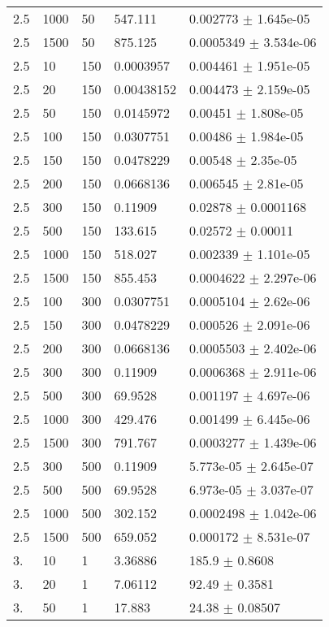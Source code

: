 \begin{longtable}{lllll}
 2.5 &  1000 &    50 &  547.111 & 0.002773 $\pm$ 1.645e-05 \\
 2.5 &  1500 &    50 &  875.125 & 0.0005349 $\pm$ 3.534e-06 \\
 2.5 &    10 &   150 & 0.0003957 & 0.004461 $\pm$ 1.951e-05 \\
 2.5 &    20 &   150 & 0.00438152 & 0.004473 $\pm$ 2.159e-05 \\
 2.5 &    50 &   150 & 0.0145972 &  0.00451 $\pm$ 1.808e-05 \\
 2.5 &   100 &   150 & 0.0307751 &  0.00486 $\pm$ 1.984e-05 \\
 2.5 &   150 &   150 & 0.0478229 &  0.00548 $\pm$ 2.35e-05 \\
 2.5 &   200 &   150 & 0.0668136 & 0.006545 $\pm$ 2.81e-05 \\
 2.5 &   300 &   150 &  0.11909 &  0.02878 $\pm$ 0.0001168 \\
 2.5 &   500 &   150 &  133.615 &  0.02572 $\pm$  0.00011 \\
 2.5 &  1000 &   150 &  518.027 & 0.002339 $\pm$ 1.101e-05 \\
 2.5 &  1500 &   150 &  855.453 & 0.0004622 $\pm$ 2.297e-06 \\
 2.5 &   100 &   300 & 0.0307751 & 0.0005104 $\pm$ 2.62e-06 \\
 2.5 &   150 &   300 & 0.0478229 & 0.000526 $\pm$ 2.091e-06 \\
 2.5 &   200 &   300 & 0.0668136 & 0.0005503 $\pm$ 2.402e-06 \\
 2.5 &   300 &   300 &  0.11909 & 0.0006368 $\pm$ 2.911e-06 \\
 2.5 &   500 &   300 &  69.9528 & 0.001197 $\pm$ 4.697e-06 \\
 2.5 &  1000 &   300 &  429.476 & 0.001499 $\pm$ 6.445e-06 \\
 2.5 &  1500 &   300 &  791.767 & 0.0003277 $\pm$ 1.439e-06 \\
 2.5 &   300 &   500 &  0.11909 & 5.773e-05 $\pm$ 2.645e-07 \\
 2.5 &   500 &   500 &  69.9528 & 6.973e-05 $\pm$ 3.037e-07 \\
 2.5 &  1000 &   500 &  302.152 & 0.0002498 $\pm$ 1.042e-06 \\
 2.5 &  1500 &   500 &  659.052 & 0.000172 $\pm$ 8.531e-07 \\
  3. &    10 &     1 &  3.36886 &    185.9 $\pm$   0.8608 \\
  3. &    20 &     1 &  7.06112 &    92.49 $\pm$   0.3581 \\
  3. &    50 &     1 &   17.883 &    24.38 $\pm$  0.08507 \\

\end{longtable}

